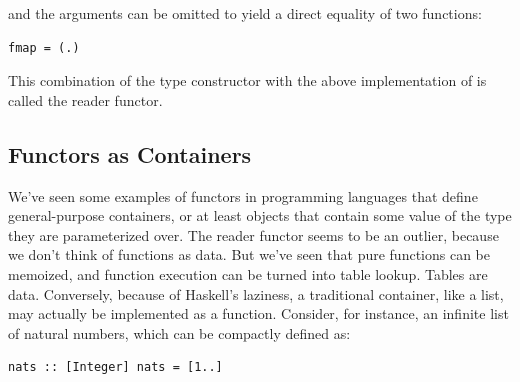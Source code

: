 and the arguments can be omitted to yield a direct equality of two
functions:

\begin{verbatim}
fmap = (.)
\end{verbatim}

This combination of the type constructor 
with the above implementation of  is called the reader
functor.

\subsection{Functors as Containers}\label{functors-as-containers}

We've seen some examples of functors in programming languages that
define general-purpose containers, or at least objects that contain some
value of the type they are parameterized over. The reader functor seems
to be an outlier, because we don't think of functions as data. But we've
seen that pure functions can be memoized, and function execution can be
turned into table lookup. Tables are data. Conversely, because of
Haskell's laziness, a traditional container, like a list, may actually
be implemented as a function. Consider, for instance, an infinite list
of natural numbers, which can be compactly defined as:

\begin{verbatim}
nats :: [Integer] nats = [1..]
\end{verbatim}

